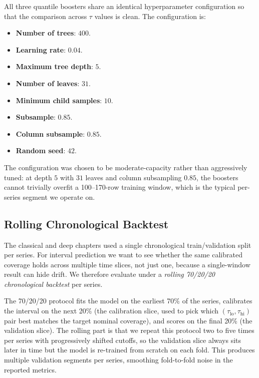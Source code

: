 All three quantile boosters share an identical hyperparameter configuration so that the comparison across $\tau$ values is clean. The configuration is:

\begin{itemize}
  \item \textbf{Number of trees}: $400$.
  \item \textbf{Learning rate}: $0.04$.
  \item \textbf{Maximum tree depth}: $5$.
  \item \textbf{Number of leaves}: $31$.
  \item \textbf{Minimum child samples}: $10$.
  \item \textbf{Subsample}: $0.85$.
  \item \textbf{Column subsample}: $0.85$.
  \item \textbf{Random seed}: $42$.
\end{itemize}

The configuration was chosen to be moderate-capacity rather than aggressively tuned: at depth $5$ with $31$ leaves and column subsampling $0.85$, the boosters cannot trivially overfit a 100--170-row training window, which is the typical per-series segment we operate on.

\subsection{Rolling Chronological Backtest}
\label{sec:quantile:rolling}

The classical and deep chapters used a single chronological train/validation split per series. For interval prediction we want to see whether the same calibrated coverage holds across multiple time slices, not just one, because a single-window result can hide drift. We therefore evaluate under a \emph{rolling 70/20/20 chronological backtest} per series.

The 70/20/20 protocol fits the model on the earliest 70\% of the series, calibrates the interval on the next 20\% (the calibration slice, used to pick which $(\tau_{\text{lo}}, \tau_{\text{hi}})$ pair best matches the target nominal coverage), and scores on the final 20\% (the validation slice). The rolling part is that we repeat this protocol two to five times per series with progressively shifted cutoffs, so the validation slice always sits later in time but the model is re-trained from scratch on each fold. This produces multiple validation segments per series, smoothing fold-to-fold noise in the reported metrics.

